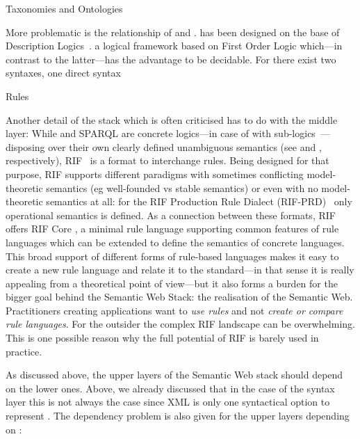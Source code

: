 Taxonomies and Ontologies

More problematic is the relationship of \owl and \rdf. \owl  has been designed on the base of Description Logics~\cite{dl}. a logical framework based on First Order Logic 
which---in contrast to the latter---has the advantage to be decidable. For \owl there exist two syntaxes, one direct syntax 


Rules

Another detail of the stack which is often criticised has to do with the middle layer: While \owl and SPARQL are concrete logics---in case of \owl 
with sub-logics~\cite{OWLRL}---disposing 
over their own clearly defined unambiguous semantics (see \cite{owlrdfsem,owldsem} 
and \cite{sparql}, respectively), RIF~\cite{rif} is a format to interchange rules. Being designed for that purpose, RIF supports different paradigms with sometimes 
conflicting model-theoretic semantics (eg well-founded vs stable semantics) or even with no model-theoretic semantics at all: 
for the RIF Production Rule Dialect (RIF-PRD)~\cite{rifprd} only operational semantics is defined. 
As a connection between these formats, RIF offers RIF Core \cite{rifcore}, a minimal rule language supporting common features of rule languages which can be 
extended to define the semantics of concrete languages.
This broad support of different forms of rule-based languages makes it easy to create a new rule language and relate it to the standard---in that sense it is really
appealing from a theoretical point of view---but it also forms a burden for the bigger goal
behind the Semantic Web Stack: the realisation of the Semantic Web. Practitioners creating applications want to \emph{use rules}
and not  \emph{create or compare rule languages}. For the outsider the complex RIF landscape can be overwhelming. This is one possible reason why the 
full potential of RIF is barely used in practice. 


As discussed above, the upper layers of the Semantic Web stack should depend on the lower ones. 
Above, we already discussed that in the case of the syntax layer this is not always the case 
since XML is only one syntactical option to represent \rdf. The dependency problem is also given for the upper layers depending on \rdf:

